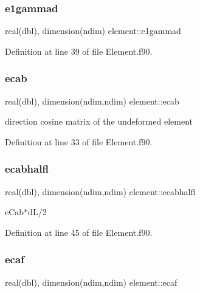 \subsubsection{\texorpdfstring{e1gammad}{e1gammad}}
{\footnotesize\ttfamily real(dbl), dimension(ndim) element\+::e1gammad\hspace{0.3cm}{\ttfamily [private]}}



Definition at line 39 of file Element.\+f90.

\mbox{\label{namespaceelement_a235dfda3fd31cfbf932e5a7cba3d18ec}} 
\subsubsection{\texorpdfstring{ecab}{ecab}}
{\footnotesize\ttfamily real(dbl), dimension(ndim,ndim) element\+::ecab\hspace{0.3cm}{\ttfamily [private]}}



direction cosine matrix of the undeformed element 



Definition at line 33 of file Element.\+f90.

\mbox{\label{namespaceelement_af027b6db49efde36e310bc9e4f8e0d06}} 
\subsubsection{\texorpdfstring{ecabhalfl}{ecabhalfl}}
{\footnotesize\ttfamily real(dbl), dimension(ndim,ndim) element\+::ecabhalfl\hspace{0.3cm}{\ttfamily [private]}}



e\+Cab$\ast$d\+L/2 



Definition at line 45 of file Element.\+f90.

\mbox{\label{namespaceelement_a8cf9df9304438d7eaddcd8609c6968c5}} 
\subsubsection{\texorpdfstring{ecaf}{ecaf}}
{\footnotesize\ttfamily real(dbl), dimension(ndim,ndim) element\+::ecaf\hspace{0.3cm}{\ttfamily [private]}}



